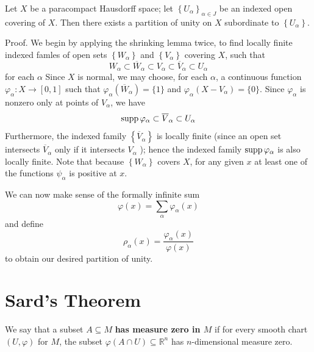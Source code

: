 \documentclass[12pt, oneside]{book}
\begin{document}
\begin{theorem}
    Let $X$ be a paracompact Hausdorff space; let $\left\{U_\alpha\right\}_{\alpha \in J}$ be an indexed open covering of $X$. Then there exists a partition of unity on $X$ subordinate to $\left\{U_\alpha\right\}$.

    Proof.
    We begin by applying the shrinking lemma twice, to find locally finite indexed famles of open sets $\left\{W_\alpha\right\}$ and $\left\{V_\alpha\right\}$ covering $X$, such that
    \begin{equation*}
        W_\alpha \subset \overline{W}_\alpha \subset V_\alpha \subset \overline{V}_\alpha \subset U_\alpha
    \end{equation*}
    for each $\alpha$ Since $X$ is normal, we may choose, for each $\alpha$, a continuous function $\varphi_\alpha: X \rightarrow[0,1]$ such that $\varphi_\alpha\left(\overline{W}_\alpha\right)=\{1\}$ and $\varphi_\alpha\left(X-V_\alpha\right)=\{0\}$.
    Since $\varphi_\alpha$ is nonzero only at points of $V_\alpha$, we have
    \begin{equation*}
        \operatorname{\operatorname{supp}} \varphi_\alpha\subset \overline{V}_\alpha \subset U_\alpha
    \end{equation*}
    Furthermore, the indexed family $\left\{\overline{V}_\alpha\right\}$ is locally finite (since an open set intersects $\overline{V}_\alpha$ only if it intersects $V_\alpha$ ); hence the indexed family  $\operatorname{\operatorname{supp}} \varphi_\alpha$ is also locally finite. Note that because $\left\{W_\alpha\right\}$ covers $X$, for any given $x$ at least one of the functions $\psi_\alpha$ is positive at $x$.

    We can now make sense of the formally infinite sum
    \begin{equation*}
        \varphi(x)=\sum_\alpha \varphi_\alpha(x)
    \end{equation*}
    and define
    \begin{equation*}
        \rho_\alpha(x)
        =
        \frac{\varphi_\alpha(x)}{\varphi(x)}
    \end{equation*}
    to obtain our desired partition of unity.
\end{theorem}

\section{Sard's Theorem}
\begin{definition}
    We say that a subset $A \subseteq M$ \textbf{has measure zero in $M$} if for every smooth chart $(U, \varphi)$ for $M$, the subset $\varphi(A \cap U) \subseteq \mathbb{R}^n$ has $n$-dimensional measure zero.


\end{definition}
\end{document}
